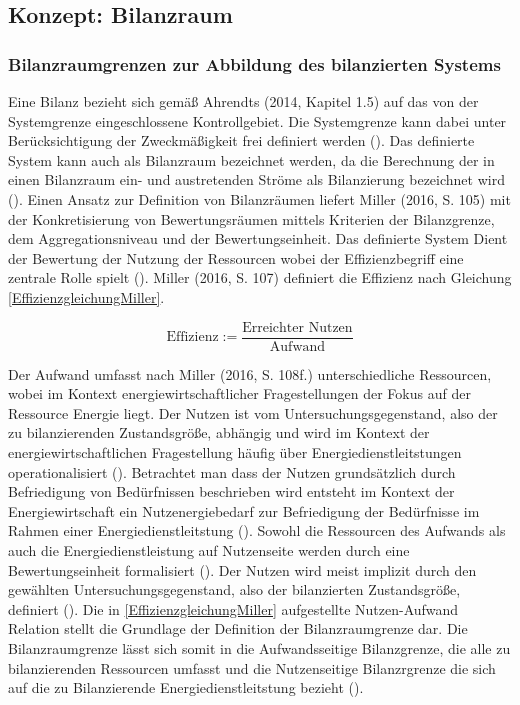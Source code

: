 \subsection{Konzept: Bilanzraum}


\subsubsection{Bilanzraumgrenzen zur Abbildung des bilanzierten Systems}
Eine Bilanz bezieht sich gemäß Ahrendts (2014, Kapitel 1.5) auf das von der Systemgrenze eingeschlossene Kontrollgebiet. 
Die Systemgrenze kann dabei unter Berücksichtigung der Zweckmäßigkeit frei definiert werden (\cite[Kapitel 1.5]{Ahrendts.2014}).
Das definierte System kann auch als Bilanzraum bezeichnet werden, da die Berechnung der in einen Bilanzraum ein- und austretenden Ströme als Bilanzierung bezeichnet wird (\cite[S. 65]{Rönsch.2015}).
Einen Ansatz zur Definition von Bilanzräumen liefert Miller (2016, S. 105) mit der Konkretisierung von Bewertungsräumen mittels Kriterien der Bilanzgrenze, dem 
Aggregationsniveau und der Bewertungseinheit. Das definierte System Dient der Bewertung der Nutzung der Ressourcen wobei der Effizienzbegriff eine zentrale Rolle spielt (\cite[S. 107]{Miller.2016}).
Miller (2016, S. 107) definiert die Effizienz nach Gleichung \eqref{EffizienzgleichungMiller}.

\begin{equation}
    \text{Effizienz} := \frac{\text{Erreichter Nutzen}}{\text{Aufwand}}
    \label{EffizienzgleichungMiller}
\end{equation}

Der Aufwand umfasst nach Miller (2016, S. 108f.) unterschiedliche Ressourcen, wobei im Kontext energiewirtschaftlicher Fragestellungen der Fokus auf der Ressource Energie 
liegt.
Der Nutzen ist vom Untersuchungsgegenstand, also der zu bilanzierenden Zustandsgröße, abhängig und wird im Kontext der energiewirtschaftlichen 
Fragestellung häufig über Energiedienstleitstungen operationalisiert (\cite[S. 107]{Miller.2016}). Betrachtet man dass der Nutzen grundsätzlich durch Befriedigung 
von Bedürfnissen beschrieben wird entsteht im Kontext der Energiewirtschaft ein Nutzenergiebedarf zur Befriedigung der Bedürfnisse im Rahmen einer Energiedienstleitstung 
(\cite[S. 107]{Miller.2016}). 
Sowohl die Ressourcen des Aufwands als auch die Energiedienstleistung auf Nutzenseite werden durch eine Bewertungseinheit formalisiert (\cite{Miller.2016}).
Der Nutzen wird meist implizit durch den gewählten Untersuchungsgegenstand, also der bilanzierten Zustandsgröße, definiert (\cite[S. 110]{Miller.2016}).
Die in \eqref{EffizienzgleichungMiller} aufgestellte Nutzen-Aufwand Relation stellt die Grundlage der Definition der Bilanzraumgrenze dar. 
Die Bilanzraumgrenze lässt sich somit in die Aufwandsseitige Bilanzgrenze, die alle zu bilanzierenden Ressourcen umfasst und die Nutzenseitige Bilanzrgrenze die sich auf 
die zu Bilanzierende Energiedienstleitstung bezieht (\cite[S. 111]{Miller.2016}).  

